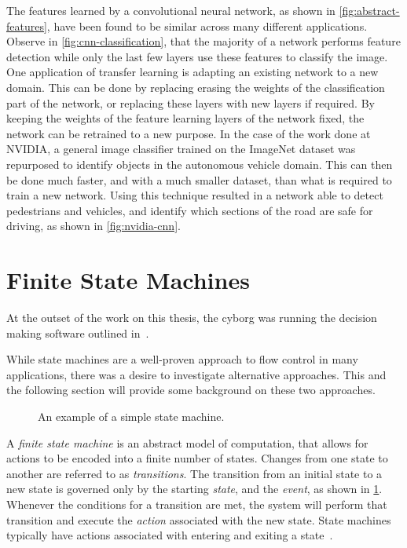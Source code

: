 \documentclass[\rootfolder/main.tex]{subfiles}
\begin{document}
The features learned by a convolutional neural network, as shown in \cref{fig:abstract-features}, have been found to be similar across many different applications.
Observe in \cref{fig:cnn-classification}, that the majority of a network performs feature detection while only the last few layers use these features to classify the image.
One application of transfer learning is adapting an existing network to a new domain.
This can be done by replacing erasing the weights of the classification part of the network, or replacing these layers with new layers if required.
By keeping the weights of the feature learning layers of the network fixed, the network can be retrained to a new purpose.
In the case of the work done at NVIDIA, a general image classifier trained on the ImageNet dataset was repurposed to identify objects in the autonomous vehicle domain.
This can then be done much faster, and with a much smaller dataset, than what is required to train a new network.
Using this technique resulted in a network able to detect pedestrians and vehicles, and identify which sections of the road are safe for driving, as shown in \cref{fig:nvidia-cnn}\cite{NVIDIA}.


\section{Finite State Machines}

At the outset of the work on this thesis, the cyborg was running the decision making software outlined in~\cite{Andersen2017}.

While state machines are a well-proven approach to flow control in many applications, there was a desire to investigate alternative approaches.
This and the following section will provide some background on these two approaches.

\begin{figure}
    \caption{An example of a simple state machine.}
    \label{fig:fsm}
\end{figure}

A \emph{finite state machine} is an abstract model of computation, that allows for actions to be encoded into a finite number of states.
Changes from one state to another are referred to as \emph{transitions}.
The transition from an initial state to a new state is governed only by the starting \emph{state}, and the \emph{event}, as shown in \cref{fig:fsm}.
Whenever the conditions for a transition are met, the system will perform that transition and execute the \emph{action} associated with the new state.
State machines typically have actions associated with entering and exiting a state~\cite{Millington2009}.
\end{document}

